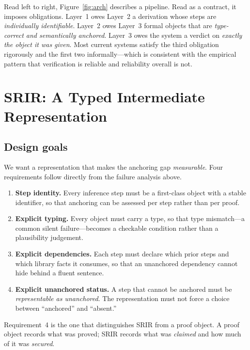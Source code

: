 \documentclass[11pt,a4paper]{article}
\theoremstyle{definition}
\theoremstyle{plain}
\theoremstyle{remark}
\begin{document}
Read left to right, Figure~\ref{fig:arch} describes a pipeline. Read as a
contract, it imposes obligations. Layer~1 owes Layer~2 a derivation whose steps
are \emph{individually identifiable}. Layer~2 owes Layer~3 formal objects that
are \emph{type-correct and semantically anchored}. Layer~3 owes the system a
verdict on \emph{exactly the object it was given}. Most current systems satisfy
the third obligation rigorously and the first two informally---which is
consistent with the empirical pattern that verification is reliable and
reliability overall is not.

\section{SRIR: A Typed Intermediate Representation}
\label{sec:srir}

\subsection{Design goals}

We want a representation that makes the anchoring gap \emph{measurable}. Four
requirements follow directly from the failure analysis above.

\begin{enumerate}
  \item \textbf{Step identity.} Every inference step must be a first-class
        object with a stable identifier, so that anchoring can be assessed
        per step rather than per proof.
  \item \textbf{Explicit typing.} Every object must carry a type, so that
        type mismatch---a common silent failure---becomes a checkable
        condition rather than a plausibility judgement.
  \item \textbf{Explicit dependencies.} Each step must declare which prior
        steps and which library facts it consumes, so that an unanchored
        dependency cannot hide behind a fluent sentence.
  \item \textbf{Explicit unanchored status.} A step that cannot be anchored must
        be \emph{representable as unanchored}. The representation must not force
        a choice between ``anchored'' and ``absent.''
\end{enumerate}

Requirement~4 is the one that distinguishes SRIR from a proof object. A proof
object records what was proved; SRIR records what was \emph{claimed} and how
much of it was \emph{secured}.
\end{document}
